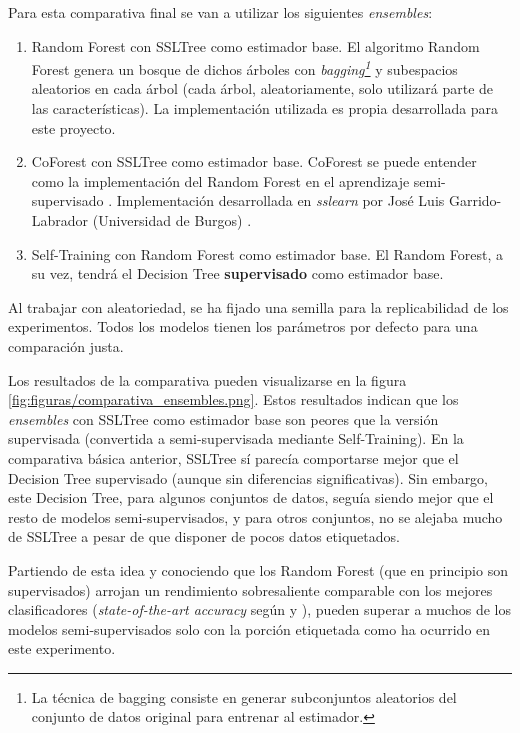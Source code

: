 Para esta comparativa final se van a utilizar los siguientes \textit{ensembles}:

\begin{enumerate}
    \item Random Forest con SSLTree como estimador base. El algoritmo Random Forest genera un bosque de dichos árboles con \textit{bagging\footnote{La técnica de bagging consiste en generar subconjuntos aleatorios del conjunto de datos original para entrenar al estimador.}} y subespacios aleatorios en cada árbol (cada árbol, aleatoriamente, solo utilizará parte de las características). La implementación utilizada es propia desarrollada para este proyecto.
    \item CoForest con SSLTree como estimador base. CoForest se puede entender como la implementación del Random Forest en el aprendizaje semi-supervisado \cite{li2007improve}. Implementación desarrollada en \textit{sslearn} por José Luis Garrido-Labrador (Universidad de Burgos) \cite{garrido2024sslearn}.
    \item Self-Training con Random Forest como estimador base. El Random Forest, a su vez, tendrá el Decision Tree \textbf{supervisado} como estimador base.
\end{enumerate}

Al trabajar con aleatoriedad, se ha fijado una semilla para la replicabilidad de los experimentos. Todos los modelos tienen los parámetros por defecto para una comparación justa.

Los resultados de la comparativa pueden visualizarse en la figura \ref{fig:figuras/comparativa_ensembles.png}. Estos resultados indican que los \textit{ensembles} con SSLTree como estimador base son peores que la versión supervisada (convertida a semi-supervisada mediante Self-Training). En la comparativa básica anterior, SSLTree sí parecía comportarse mejor que el Decision Tree supervisado (aunque sin diferencias significativas). Sin embargo, este Decision Tree, para algunos conjuntos de datos, seguía siendo mejor que el resto de modelos semi-supervisados, y para otros conjuntos, no se alejaba mucho de SSLTree a pesar de que disponer de pocos datos etiquetados. 

Partiendo de esta idea y conociendo que los Random Forest (que en principio son supervisados) arrojan un rendimiento sobresaliente comparable con los mejores clasificadores (\textit{state-of-the-art accuracy} según \cite{salles2021bias} y \cite{dorador2024improving}), pueden superar a muchos de los modelos semi-supervisados solo con la porción etiquetada como ha ocurrido en este experimento.

